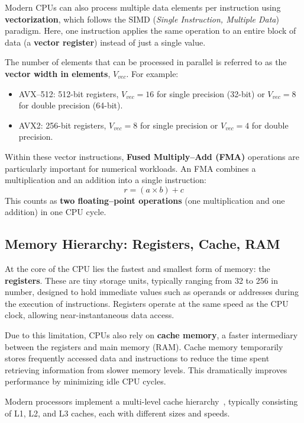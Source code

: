 Modern CPUs can also process multiple data elements per instruction using \textbf{vectorization}, which follows the SIMD (\textit{Single Instruction, Multiple Data}) paradigm.  
Here, one instruction applies the same operation to an entire block of data (a \textbf{vector register}) instead of just a single value.  

\clearpage

The number of elements that can be processed in parallel is referred to as the \textbf{vector width in elements}, $V_{vec}$.  
For example:
\begin{itemize}
    \item AVX–512: 512-bit registers, $V_{vec} = 16$ for single precision (32-bit) or $V_{vec} = 8$ for double precision (64-bit).
    \item AVX2: 256-bit registers, $V_{vec} = 8$ for single precision or $V_{vec} = 4$ for double precision.
\end{itemize}

Within these vector instructions, \textbf{Fused Multiply–Add (FMA)} operations are particularly important for numerical workloads. An FMA combines a multiplication and an addition into a single instruction:
\[
r = (a \times b) + c
\]
This counts as \textbf{two floating–point operations} (one multiplication and one addition) in one CPU cycle. 

\subsection{Memory Hierarchy: Registers, Cache, RAM}


At the core of the CPU lies the fastest and smallest form of memory: the \textbf{registers}. These are tiny storage units, typically ranging from 32 to 256 in number, designed to hold immediate values such as operands or addresses during the execution of instructions. Registers operate at the same speed as the CPU clock, allowing near-instantaneous data access.

Due to this limitation, CPUs also rely on \textbf{cache memory}, a faster intermediary between the registers and main memory (RAM). Cache memory temporarily stores frequently accessed data and instructions to reduce the time spent retrieving information from slower memory levels. This dramatically improves performance by minimizing idle CPU cycles.

Modern processors implement a multi-level cache hierarchy~\cite{CPUmemoryhierarchy}, typically consisting of L1, L2, and L3 caches, each with different sizes and speeds.

